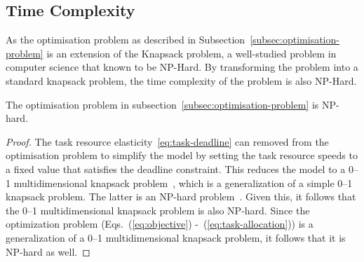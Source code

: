 \subsection{Time Complexity}
\label{subsec:time-complexity}
As the optimisation problem as described in Subsection~\ref{subsec:optimisation-problem} is an extension of the
Knapsack problem, a well-studied problem in computer science that known to be NP-Hard. By transforming the problem into
a standard knapsack problem, the time complexity of the problem is also NP-Hard.
\begin{theorem}
    The optimisation problem in subsection~\ref{subsec:optimisation-problem} is NP-hard.
\end{theorem}
\begin{proof}
    The task resource elasticity~\ref{eq:task-deadline} can removed from the optimisation problem to simplify the model
    by setting the task resource speeds to a fixed value that satisfies the deadline constraint. This reduces the model
    to a 0--1 multidimensional knapsack problem~\cite{knapsackproblems_2004}, which is a generalization of a
    simple 0--1 knapsack problem. The latter is an NP-hard problem~\cite{knapsackproblems_2004}. Given this, it follows
    that the 0--1 multidimensional knapsack problem is also NP-hard. Since the optimization problem
    (Eqs.~(\ref{eq:objective}) -~(\ref{eq:task-allocation})) is a generalization of a 0--1 multidimensional knapsack
    problem, it follows that it is NP-hard as well.
\end{proof}

